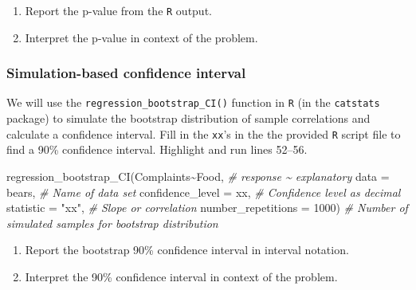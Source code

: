 \documentclass[
]{report}
\newenvironment{Shaded}{\begin{snugshade}}{\end{snugshade}}
\newcommand{\AttributeTok}[1]{\textcolor[rgb]{0.77,0.63,0.00}{#1}}
\newcommand{\CommentTok}[1]{\textcolor[rgb]{0.56,0.35,0.01}{\textit{#1}}}
\newcommand{\DecValTok}[1]{\textcolor[rgb]{0.00,0.00,0.81}{#1}}
\newcommand{\FunctionTok}[1]{\textcolor[rgb]{0.00,0.00,0.00}{#1}}
\newcommand{\NormalTok}[1]{#1}
\newcommand{\SpecialCharTok}[1]{\textcolor[rgb]{0.00,0.00,0.00}{#1}}
\newcommand{\StringTok}[1]{\textcolor[rgb]{0.31,0.60,0.02}{#1}}
\begin{document}
\begin{enumerate}
\def\labelenumi{\arabic{enumi}.}
\setcounter{enumi}{8}
\item
  Report the p-value from the \texttt{R} output.
  \vspace{0.3in}
\item
  Interpret the p-value in context of the problem.
  \vspace{0.8in}
\end{enumerate}

\hypertarget{simulation-based-confidence-interval-1}{%
\subsubsection*{Simulation-based confidence interval}\label{simulation-based-confidence-interval-1}}

We will use the \texttt{regression\_bootstrap\_CI()} function in \texttt{R} (in the \texttt{catstats} package) to simulate the bootstrap distribution of sample correlations and calculate a confidence interval. Fill in the \texttt{xx}'s in the the provided \texttt{R} script file to find a 90\% confidence interval. Highlight and run lines 52--56.

\begin{Shaded}
\begin{Highlighting}[]
\FunctionTok{regression\_bootstrap\_CI}\NormalTok{(Complaints}\SpecialCharTok{\textasciitilde{}}\NormalTok{Food, }\CommentTok{\# response \textasciitilde{} explanatory}
   \AttributeTok{data =}\NormalTok{ bears, }\CommentTok{\# Name of data set}
   \AttributeTok{confidence\_level =}\NormalTok{ xx, }\CommentTok{\# Confidence level as decimal}
   \AttributeTok{statistic =} \StringTok{"xx"}\NormalTok{, }\CommentTok{\# Slope or correlation}
   \AttributeTok{number\_repetitions =} \DecValTok{1000}\NormalTok{) }\CommentTok{\# Number of simulated samples for bootstrap distribution}
\end{Highlighting}
\end{Shaded}

\begin{enumerate}
\def\labelenumi{\arabic{enumi}.}
\setcounter{enumi}{10}
\item
  Report the bootstrap 90\% confidence interval in interval notation.\\
  \vspace{0.5in}
\item
  Interpret the 90\% confidence interval in context of the problem.
  \vspace{0.8in}
\end{enumerate}
\end{document}

